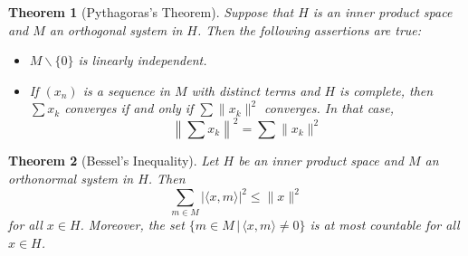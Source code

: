 \documentclass[10pt, oneside, reqno]{amsart}
\theoremstyle{plain}%
\newtheorem{thm}{Theorem}[section]
\theoremstyle{definition}
\theoremstyle{remark}
\newcommand{\iprod}[2]{\langle #1, #2 \rangle}
\begin{document}
\begin{thm}[Pythagoras's Theorem]
	Suppose that $H$ is an inner product space and $M$ an orthogonal system in $H$.  Then the following assertions are true:
	\begin{itemize}
		\item $M \backslash \{0\}$ is linearly independent.
		\item If $(x_n)$ is a sequence in $M$ with distinct terms and $H$ is complete, then $\sum x_k$ converges if and only if $\sum \| x_k \|^2$ converges.  In that case, \[
			\left\| \sum x_k \right\|^2 = \sum \|x_k \|^2
		\]
	\end{itemize}
\end{thm}

\begin{thm}[Bessel's Inequality]
	Let $H$ be an inner product space and $M$ an orthonormal system in $H$.  Then \[
		\sum_{m \in M} | \iprod{x}{m}|^2 \leq \| x \|^2
	\]
	for all $x \in H$.  Moreover, the set $\{ m \in M \, | \, \iprod{x}{m} \neq 0 \}$ is at most countable for all $x \in H$.
\end{thm}

\end{document}
